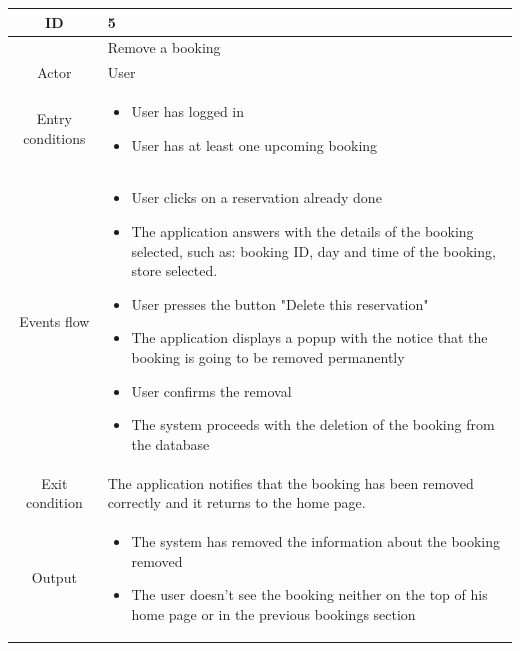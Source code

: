 \documentclass[table, 12pt]{article}
\begin{document}
\begin{longtable}{|c| p{10cm}|}
    \hline ID        & 5                                                                                                                                                                                         \\
    \hline
                     & Remove a booking                                                                                                                                                                          \\
    \hline
    Actor            & User                                                                                                                                                                                      \\
    \hline
    Entry conditions & \begin{itemize}
        \item User has logged in
        \item User has at least one upcoming booking
    \end{itemize}                                                                                                                                                                \\
    \hline
    Events flow      & \begin{itemize}[nosep,after=\strut]
        \item User clicks on a reservation already done
        \item The application answers with the details of the booking selected, such as: booking ID, day and time of the booking, store selected.
        \item User presses the button "Delete this reservation"
        \item The application displays a popup with the notice that the booking is going to be removed permanently
        \item User confirms the removal
        \item The system proceeds with the deletion of the booking from the database
    \end{itemize}                                                                                                                                                                \\
    \hline
    Exit condition   & The application notifies that the booking has been removed correctly and it returns to the home page.                                                                                     \\ \hline
    Output           & \begin{itemize}
        \item   The system has removed the information about the booking removed
        \item The user doesn't see the booking neither on the top of his home page or in the previous bookings section


\end{itemize}
\end{longtable}
\end{document}
